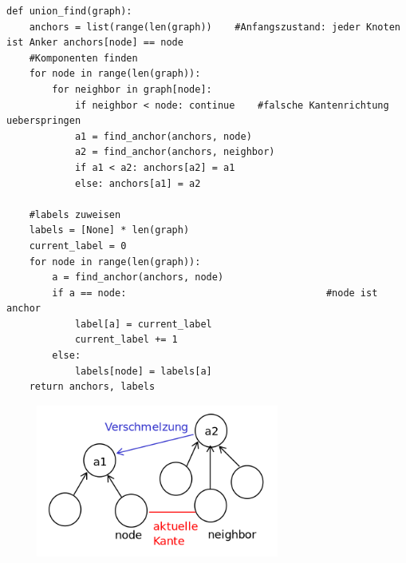             \begin{verbatim}
def union_find(graph):
    anchors = list(range(len(graph))    #Anfangszustand: jeder Knoten ist Anker anchors[node] == node
    #Komponenten finden
    for node in range(len(graph)):
        for neighbor in graph[node]:
            if neighbor < node: continue    #falsche Kantenrichtung ueberspringen
            a1 = find_anchor(anchors, node)
            a2 = find_anchor(anchors, neighbor)
            if a1 < a2: anchors[a2] = a1
            else: anchors[a1] = a2

    #labels zuweisen
    labels = [None] * len(graph)
    current_label = 0
    for node in range(len(graph)):
        a = find_anchor(anchors, node)
        if a == node:                                   #node ist anchor
            label[a] = current_label
            current_label += 1
        else:
            labels[node] = labels[a]
    return anchors, labels
            \end{verbatim}
    \begin{center}
        \includegraphics[width=10cm,height=5cm,keepaspectratio]{./Pictures/Verschmelzung.png}
    \end{center}


